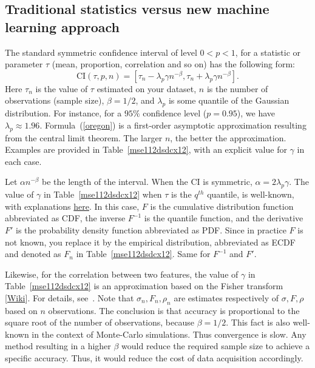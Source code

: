 \documentclass[oneside,10pt]{book}
\begin{document}
\subsection{Traditional statistics versus new machine learning approach}\label{excetp09}

The standard symmetric confidence interval of level $0<p<1$, for a statistic or parameter $\tau$ (mean, proportion, correlation and so on) has the following form:
\begin{equation}
\text{CI}(\tau, p, n) = [\tau_n - \lambda_p \gamma n^{-\beta},  \tau_n + \lambda_p \gamma n^{-\beta}].\label{oregon}
\end{equation}
Here $\tau_n$ is the value of $\tau$ estimated on your dataset, $n$ is the number of observations (sample size),
$\beta = 1/2$, and $\lambda_p$ is some quantile of the Gaussian distribution. For instance, for a $95\%$ confidence level ($p=0.95$),
 we have $\lambda_p \approx 1.96$. Formula~(\ref{oregon}) is a first-order
\textcolor{index}{asymptotic approximation} resulting from the
 \textcolor{index}{central limit theorem}. The larger $n$, the better the approximation.
 Examples are provided in Table~\ref{mse112dsdcx12}, with an explicit value for $\gamma$ in each case.

Let $\alpha n^{-\beta}$ be the length of the interval.
When the CI is symmetric, $\alpha = 2\lambda_p \gamma$.
 The value of $\gamma$ in
 Table~\ref{mse112dsdcx12} when $\tau$ is the
 $q^{th}$ quantile, is well-known, with explanations \href{https://stats.stackexchange.com/questions/99829/how-to-obtain-a-confidence-interval-for-a-percentile}{here}.
In this case, $F$ is the
\textcolor{index}{cumulative distribution function} abbreviated as CDF, the inverse $F^{-1}$ is the \textcolor{index}{quantile function}, and the derivative $F'$ is the \textcolor{index}{probability density function} abbreviated as PDF.
 Since in practice $F$ is not known, you replace it by the \textcolor{index}{empirical distribution}, abbreviated as ECDF and denoted as $F_n$ in Table~\ref{mse112dsdcx12}. Same for $F^{-1}$ and $F'$.

Likewise, for the correlation between two features, the value of $\gamma$ in Table~\ref{mse112dsdcx12}
 is an approximation based on the \textcolor{index}{Fisher transform} [\href{https://en.wikipedia.org/wiki/Fisher_transformation}{Wiki}].
 For details, see~\cite{b18psy}. Note that $\sigma_n, F_n, \rho_n$ are estimates respectively of $\sigma, F, \rho$ based on $n$ observations.
 The conclusion is that accuracy is proportional to the square root of the number of observations, because $\beta = 1/2$. This fact is also well-known in the context of Monte-Carlo simulations. Thus convergence is slow. Any method resulting in a higher $\beta$ would reduce the required sample size to achieve a specific
 accuracy. Thus, it would reduce the cost of data acquisition accordingly.
\end{document}
